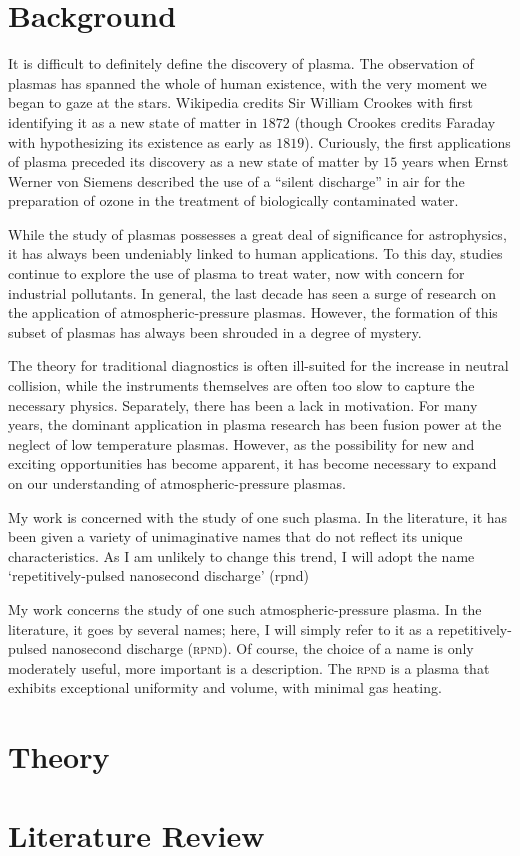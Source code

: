 \section{Background}
It is difficult to definitely define the discovery of plasma. The observation of
plasmas has spanned the whole of human existence, with the very moment we began
to gaze at the stars. Wikipedia credits Sir William Crookes with first
identifying it as a new state of matter in $1872$ (though Crookes credits
Faraday with hypothesizing its existence as early as $1819$). Curiously, the
first applications of plasma preceded its discovery as a new state of matter by
$15$ years when Ernst Werner von Siemens described the use of a ``silent
discharge'' in air for the preparation of ozone in the treatment of biologically
contaminated water.

While the study of plasmas possesses a great deal of significance for
astrophysics, it has always been undeniably linked to human applications.  To
this day, studies continue to explore the use of plasma to treat water, now with
concern for industrial pollutants. In general, the last decade has seen a surge
of research on the application of atmospheric-pressure plasmas. However, the
formation of this subset of plasmas has always been shrouded in a degree of
mystery.

The theory for traditional diagnostics is often ill-suited for the increase in
neutral collision, while the instruments themselves are often too slow to
capture the necessary physics. Separately, there has been a lack in motivation.
For many years, the dominant application in plasma research has been fusion
power at the neglect of low temperature plasmas. However, as the possibility for
new and exciting opportunities has become apparent, it has become necessary to
expand on our understanding of atmospheric-pressure plasmas.

My work is concerned with the study of one such plasma. In the literature, it
has been given a variety of unimaginative names that do not reflect its unique
characteristics. As I am unlikely to change this trend, I will adopt the name
`repetitively-pulsed nanosecond discharge' (\ac{rpnd})

My work concerns the study of one such atmospheric-pressure plasma. In the
literature, it goes by several names; here, I will simply refer to it as a
repetitively-pulsed nanosecond discharge (\textsc{rpnd}). Of course, the choice
of a name is only moderately useful, more important is a description. The
\textsc{rpnd} is a plasma that exhibits exceptional uniformity and volume, with
minimal gas heating.

\section{Theory}

\section{Literature Review}

